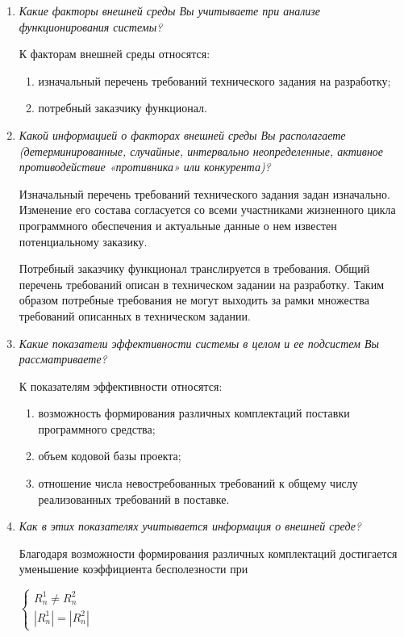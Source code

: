\documentclass{article}
\begin{document}
\begin{enumerate}
        \item \textit{Какие факторы внешней среды Вы учитываете при анализе функционирования системы?}

        К факторам внешней среды относятся:
        \begin{enumerate}
            \item изначальный перечень требований технического задания на разработку;
            \item потребный заказчику функционал.
        \end{enumerate}

        \item \textit{Какой информацией о факторах внешней среды Вы располагаете (детерминированные, случайные, интервально неопределенные, активное противодействие «противника» или конкурента)?}

        Изначальный перечень требований технического задания задан изначально. Изменение его состава согласуется со всеми участниками жизненного цикла программного обеспечения и актуальные данные о нем известен потенциальному заказику.

        Потребный заказчику функционал транслируется в требования. Общий перечень требований описан в техническом задании на разработку. Таким образом потребные требования не могут выходить за рамки множества требований описанных в техническом задании.

        \item \textit{Какие показатели эффективности системы в целом и ее подсистем Вы рассматриваете?}

        К показателям эффективности относятся:
        \begin{enumerate}
            \item возможность формирования различных комплектаций поставки программного средства;
            \item объем кодовой базы проекта;
            \item отношение числа невостребованных требований к общему числу реализованных требований в поставке.
        \end{enumerate}

        \item \textit{Как в этих показателях учитывается информация о внешней среде?}

        Благодаря возможности формирования различных комплектаций достигается уменьшение коэффициента бесполезности при 

        \begin{center}
        $
            \begin{cases}
                R^1_{n} \not = R^2_{n}\\
                |R^1_{n}| = |R^2_{n}|
            \end{cases}
        $
        \end{center}


\end{enumerate}
\end{document}
